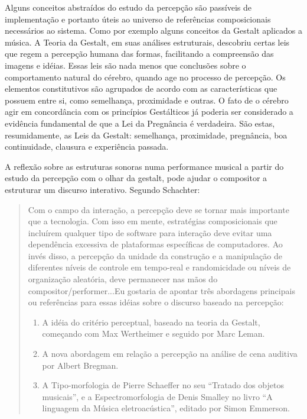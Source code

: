 \documentclass{ppgmus}
\begin{document}




Alguns conceitos abstraídos do estudo da percepção são passíveis de implementação e portanto úteis 
ao universo de referências composicionais necessários ao sistema. Como por exemplo 
alguns conceitos da Gestalt aplicados a música. A Teoria da Gestalt, em suas análises estruturais, 
descobriu certas leis que regem a
percepção humana das formas, facilitando a compreensão das imagens e idéias. Essas leis são
nada menos que conclusões sobre o comportamento natural do cérebro, quando age no
processo de percepção. Os elementos constitutivos são agrupados de acordo com as
características que possuem entre si, como semelhança, proximidade e outras. O fato de o cérebro agir 
em concordância com os princípios Gestálticos já poderia ser
considerado a evidência fundamental de que a Lei da Pregnância é verdadeira. São estas,
resumidamente, as Leis da Gestalt: semelhança, proximidade, pregnância, boa continuidade, clausura e 
experiência passada.


A reflexão sobre as estruturas sonoras numa performance musical a partir do estudo
da percepção com o olhar da gestalt, pode ajudar o compositor a estruturar um 
discurso interativo. Segundo Schachter:
\begin{quote}
 Com o campo da interação, a percepção deve se tornar mais importante que a tecnologia.
Com isso em mente, estratégias composicionais que incluírem qualquer tipo de software
 para interação deve evitar uma dependência excessiva de plataformas específicas de 
computadores. Ao invés disso, a percepção da unidade da construção e a manipulação de
diferentes níveis de controle em tempo-real e randomicidade ou níveis de organização
aleatória, deve permanecer nas mãos do compositor/performer...Eu gostaria de apontar
três abordagens principais ou referências para essas idéias sobre o discurso baseado
na percepção:
\begin{enumerate}
  \item A idéia do critério perceptual, baseado na teoria da Gestalt, começando com
Max Wertheimer e seguido por Marc Leman.
  \item A nova abordagem em relação a percepção na análise de cena auditiva por Albert
Bregman.
  \item A Tipo-morfologia de Pierre Schaeffer no seu ``Tratado dos objetos musicais'',
e a Espectromorfologia de Denis Smalley no livro ``A linguagem da Música eletroacústica'', editado
por Simon Emmerson.
\cite{schachter07:discourse}
\end{enumerate}
\end{quote} 
\end{document}
